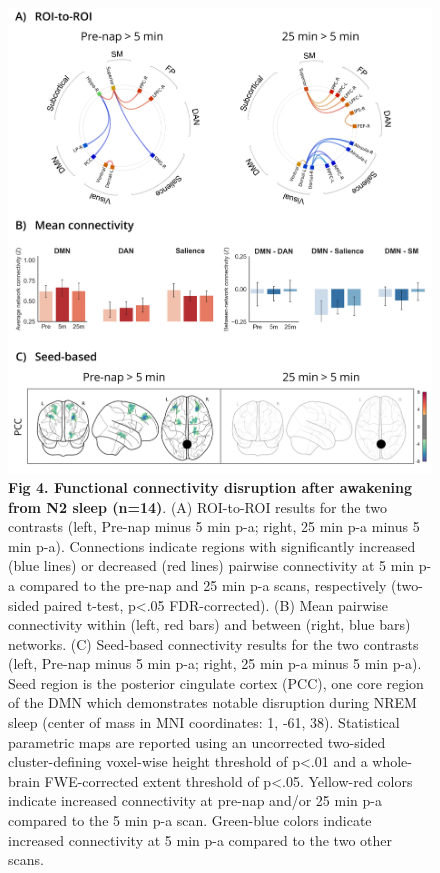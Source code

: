 \begin{figure}[!htbp]
	\includegraphics[width=\textwidth]{Fig/Results/Inertia/Inertia/Fig4_N2.png}
	\caption*{\textbf{Fig 4. Functional connectivity disruption after awakening from N2 sleep (n=14)}. (A) ROI-to-ROI results for the two contrasts (left, Pre-nap minus 5 min p-a; right, 25 min p-a minus 5 min p-a). Connections indicate regions with significantly increased (blue lines) or decreased (red lines) pairwise connectivity at 5 min p-a compared to the pre-nap and 25 min p-a scans, respectively (two-sided paired t-test, p<.05 FDR-corrected). (B) Mean pairwise connectivity within (left, red bars) and between (right, blue bars) networks. (C) Seed-based connectivity results for the two contrasts (left, Pre-nap minus 5 min p-a; right, 25 min p-a minus 5 min p-a). Seed region is the posterior cingulate cortex (PCC), one core region of the DMN which demonstrates notable disruption during NREM sleep (center of mass in MNI coordinates: 1, -61, 38). Statistical parametric maps are reported using an uncorrected two-sided cluster-defining voxel-wise height threshold of p<.01 and a whole-brain FWE-corrected extent threshold of p<.05. Yellow-red colors indicate increased connectivity at pre-nap and/or 25 min p-a compared to the 5 min p-a scan. Green-blue colors indicate increased connectivity at 5 min p-a compared to the two other scans.}
\end{figure}


